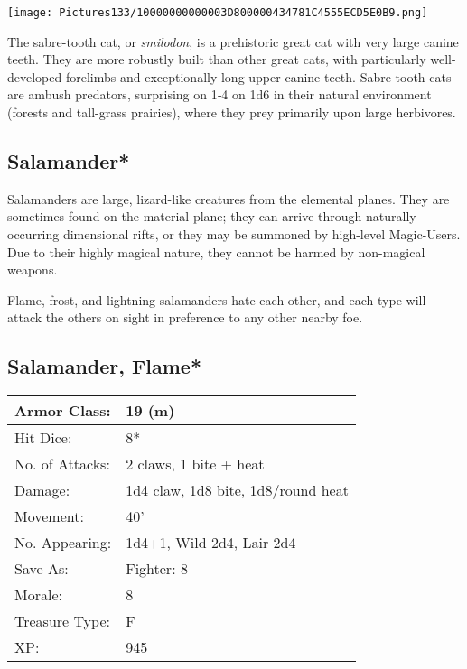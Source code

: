 \documentclass[a4paper,twoside,openany,10pt]{book}
\begin{document}
\begin{multicols}{2}
\begin{center} \texttt{[image: Pictures133/10000000000003D800000434781C4555ECD5E0B9.png]} \end{center}

The sabre-tooth cat, or \emph{smilodon}, is a prehistoric great cat with very large canine teeth. They are more robustly built than other great cats, with particularly well-developed forelimbs and exceptionally long upper canine teeth. Sabre-tooth cats are ambush predators, surprising on 1‑4 on 1d6 in their natural environment (forests and tall-grass prairies), where they prey primarily upon large herbivores.


\subsection*{Salamander*}\label{salamander}

Salamanders are large, lizard-like creatures from the elemental planes. They are sometimes found on the material plane; they can arrive through naturally-occurring dimensional rifts, or they may be summoned by high-level Magic-Users. Due to their highly magical nature, they cannot be harmed by non-magical weapons.

Flame, frost, and lightning salamanders hate each other, and each type will attack the others on sight in preference to any other nearby foe.

\subsection*{Salamander, Flame*}\label{salamander-flame}

\begin{tabularx}{0.50\textwidth}{@{}lX@{}}
Armor Class: & 19 (m) \\\hline
Hit Dice: & 8* \\\hline
No. of Attacks: & 2 claws, 1 bite + heat \\\hline
Damage: & 1d4 claw, 1d8 bite, 1d8/round heat \\\hline
Movement: & 40' \\\hline
No. Appearing: & 1d4+1, Wild 2d4, Lair 2d4 \\\hline
Save As: & Fighter: 8 \\\hline
Morale: & 8 \\\hline
Treasure Type: & F \\\hline
XP: & 945 \\\hline
\end{tabularx}\medskip



\end{multicols}
\end{document}
